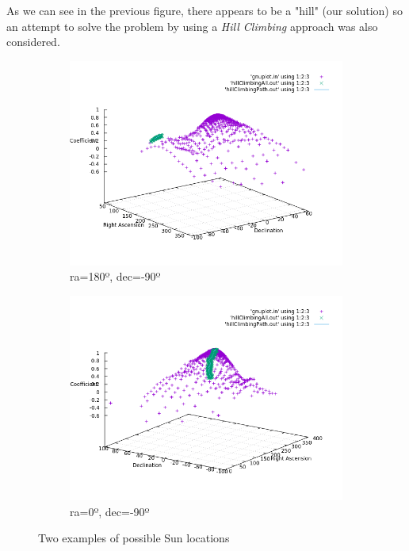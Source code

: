 As we can see in the previous figure, there appears to be a "hill" (our solution) so an attempt to solve the problem by using a \textit{Hill Climbing} approach was also considered.

\begin{figure}[!htb]
	\begin{subfigure}[b]{0.5\textwidth}
		\includegraphics[width=\linewidth]{images/ch6/hillClimbing/resultsPathBad.png}
		\caption{ra=180º, dec=-90º}
	\end{subfigure}
	\hfill
	\begin{subfigure}[b]{0.5\textwidth}
		\includegraphics[width=\linewidth]{images/ch6/hillClimbing/resultsPathGood.png}
		\caption{ra=0º, dec=-90º}
	\end{subfigure}
	\caption{Two examples of possible Sun locations}
	\label{fig:poles}
\end{figure}

